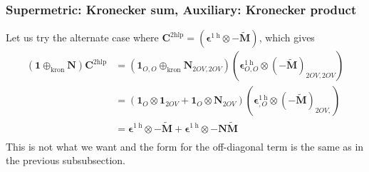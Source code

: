 \subsubsection{Supermetric: Kronecker sum, Auxiliary: Kronecker product}
Let us try the alternate case where $\bm{C}^{2\mathrm{hlp}} = \left( \bm{\epsilon}^{1 \mathrm{~h}} \otimes -\bm{\tilde{M}} \right)$, which gives
\begin{align}
 \left( \bm{1} \oplus_{\text{kron}} \bm{N} \right)\bm{C}^{2\mathrm{hlp}} &= \left(\bm{1}_{O,O} \oplus_{\text{kron}} \bm{N}_{2OV,2OV}\right) \left( \bm{\epsilon}^{1 \mathrm{~h}}_{O,O} \otimes (-\bm{\tilde{M}})_{2OV,2OV} \right)\\
&= \left( \bm{1}_O \otimes \bm{1}_{2OV} + \bm{1}_O \otimes \bm{N}_{2OV} \right) \left( \bm{\epsilon}^{1 \mathrm{~h}}_{,O} \otimes (-\bm{\tilde{M}})_{2OV,} \right)\\
&= \bm{\epsilon}^{1 \mathrm{~h}} \otimes -\bm{\tilde{M}} + \bm{\epsilon}^{1 \mathrm{~h}} \otimes -\bm{N}\bm{\tilde{M}}\\
\end{align}
This is not what we want and the form for the off-diagonal term is the same as in the previous subsubsection.

